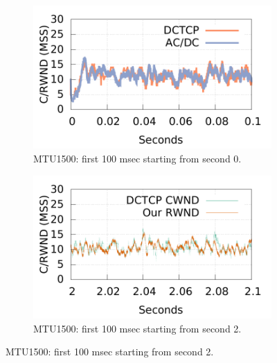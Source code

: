 \begin{figure}[!htb]
        \centering
        \begin{subfigure}[b]{0.225\textwidth}
                \centering
                \includegraphics[width=\textwidth]{figures/cwnd_rwnd/newpara_refine/mtu1500_5flows_1/measure_cwnd_rwnd_gap_15k_5flows_0sec_100msec.pdf}
                \caption{MTU1500: first 100 msec starting from second 0.}
                \label{cwnd_rwnd_1500_0sec}
        \end{subfigure}
        \begin{subfigure}[b]{0.225\textwidth}
                \centering
                \includegraphics[width=\textwidth]{figures/cwnd_rwnd/newpara_refine/mtu1500_5flows_1/measure_cwnd_rwnd_gap_15k_5flows_2sec_100msec.pdf}
                \caption{MTU1500: first 100 msec starting from second 2.}
                \label{cwnd_rwnd_1500_2sec}
        \end{subfigure}


\end{figure}
